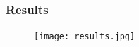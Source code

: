 \documentclass{beamer}[10]
\begin{document}
\begin{frame}
	\frametitle{Results}
	\begin{figure}
	\tiny
	\centering
		\texttt{[image: results.jpg]}
	\end{figure}

\end{frame}
\end{document}
